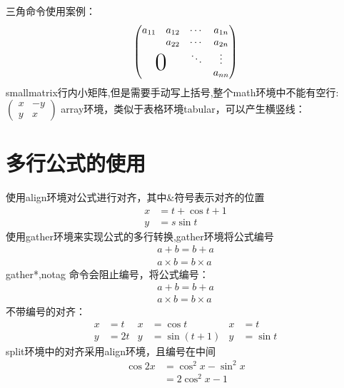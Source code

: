 \documentclass{ctexart}
\begin{document}
    三角命令使用案例：
    \[
      \begin{pmatrix}
          a_{11} & a_{12} & \cdots &a_{1n} \\
                 & a_{22} & \cdots & a_{2n} \\
                 &        & \ddots & \vdots \\
        \multicolumn{2}{c}{\raisebox{1.3ex}[0pt]{\Huge 0}} &    &a_{nn}
      \end{pmatrix}  
    \]
    smallmatrix行内小矩阵,但是需要手动写上括号,整个math环境中不能有空行:
      \begin{math}
        \left(
            \begin{smallmatrix}
                x&-y \\
                y&x
            \end{smallmatrix}
        \right)
      \end{math}
    array环境，类似于表格环境tabular，可以产生横竖线：  

    \section{多行公式的使用}
    使用align环境对公式进行对齐，其中\&符号表示对齐的位置
    \begin{align}
        x &= t+ \cos t +1 \\
        y &= s\sin t
    \end{align}
    使用gather环境来实现公式的多行转换,gather环境将公式编号
    \begin{gather}
        a+b =b+a \\
        a\times b= b\times a
    \end{gather}
    gather*,notag 命令会阻止编号，将公式编号：
    \begin{gather*}
        a+b =b+a \\
        a\times b= b\times a
    \end{gather*}
    不带编号的对齐：
    \begin{align*}
        x &=t   &   x&=\cos t       &   x&=t \\
        y &=2t  &   y&=\sin(t+1)    &   y&= \sin t 
    \end{align*}
    split环境中的对齐采用align环境，且编号在中间
    \begin{equation}
        \begin{split}
            \cos 2x &= \cos^2 x-\sin^2 x \\
                    &= 2\cos^2 x - 1
        \end{split}
    \end{equation}
\end{document}
